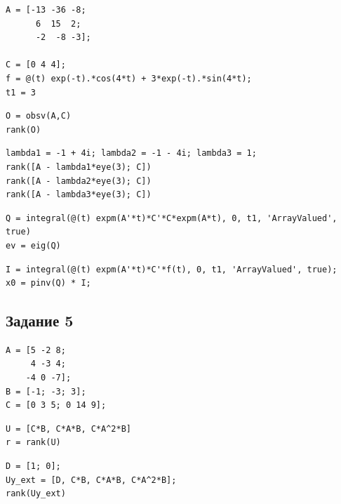 \documentclass[a4paper,12pt]{article}
\begin{document}
\begin{lstlisting}[caption={Инициализация}]
A = [-13 -36 -8;
      6  15  2;
	  -2  -8 -3];
	
C = [0 4 4];
f = @(t) exp(-t).*cos(4*t) + 3*exp(-t).*sin(4*t);
t1 = 3
\end{lstlisting}

\begin{lstlisting}[caption={Вычисление ранга матрицы наблюдаемости}, label={lst:nabl4}]
O = obsv(A,C)
rank(O)
\end{lstlisting}

\begin{lstlisting}[caption={Вычисление рангов матриц Хаутуса}, label={lst:haut4}]
lambda1 = -1 + 4i; lambda2 = -1 - 4i; lambda3 = 1;
rank([A - lambda1*eye(3); C])
rank([A - lambda2*eye(3); C])
rank([A - lambda3*eye(3); C])
\end{lstlisting}

\begin{lstlisting}[caption={Грамиан управляемости}, label={lst:gram4}]
Q = integral(@(t) expm(A'*t)*C'*C*expm(A*t), 0, t1, 'ArrayValued', true)
ev = eig(Q)
\end{lstlisting}

\begin{lstlisting}[caption={Вычисление начальных условий}, label={lst:init_state4}]
I = integral(@(t) expm(A'*t)*C'*f(t), 0, t1, 'ArrayValued', true);
x0 = pinv(Q) * I;
\end{lstlisting}

\newpage
\subsection*{Задание 5}

\begin{lstlisting}[caption={Инициализация}]
A = [5 -2 8;
	 4 -3 4;
	-4 0 -7];
B = [-1; -3; 3];
C = [0 3 5; 0 14 9];
\end{lstlisting}

\begin{lstlisting}[caption={Ранг матрицы управляемости по выходу}, label={lst:555}]
U = [C*B, C*A*B, C*A^2*B]
r = rank(U)
\end{lstlisting}

\begin{lstlisting}[caption={Проверка матрицы управляемости}, label={lst:UD}]
D = [1; 0];
Uy_ext = [D, C*B, C*A*B, C*A^2*B];
rank(Uy_ext)  
\end{lstlisting}

	
\end{document}
